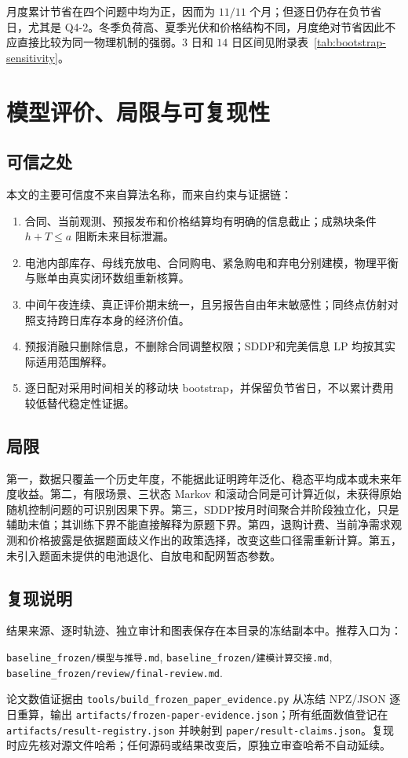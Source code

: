\documentclass[UTF8,a4paper,zihao=-4,fontset=mac]{ctexart}
\begin{document}
月度累计节省在四个问题中均为正，因而为 $11/11$ 个月；但逐日仍存在负节省日，尤其是 Q4-2。冬季负荷高、夏季光伏和价格结构不同，月度绝对节省因此不应直接比较为同一物理机制的强弱。\(3\) 日和 \(14\) 日区间见附录表~\ref{tab:bootstrap-sensitivity}。

\section{模型评价、局限与可复现性}
\subsection{可信之处}
本文的主要可信度不来自算法名称，而来自约束与证据链：
\begin{enumerate}
  \item 合同、当前观测、预报发布和价格结算均有明确的信息截止；成熟块条件 $h+T\le a$ 阻断未来目标泄漏。
  \item 电池内部库存、母线充放电、合同购电、紧急购电和弃电分别建模，物理平衡与账单由真实闭环数组重新核算。
  \item 中间午夜连续、真正评价期末统一，且另报告自由年末敏感性；同终点仿射对照支持跨日库存本身的经济价值。
  \item 预报消融只删除信息，不删除合同调整权限；SDDP和完美信息 LP 均按其实际适用范围解释。
  \item 逐日配对采用时间相关的移动块 bootstrap，并保留负节省日，不以累计费用较低替代稳定性证据。
\end{enumerate}

\subsection{局限}
第一，数据只覆盖一个历史年度，不能据此证明跨年泛化、稳态平均成本或未来年度收益。第二，有限场景、三状态 Markov 和滚动合同是可计算近似，未获得原始随机控制问题的可识别因果下界。第三，SDDP按月时间聚合并阶段独立化，只是辅助末值；其训练下界不能直接解释为原题下界。第四，退购计费、当前净需求观测和价格披露是依据题面歧义作出的政策选择，改变这些口径需重新计算。第五，未引入题面未提供的电池退化、自放电和配网暂态参数。

\subsection{复现说明}
结果来源、逐时轨迹、独立审计和图表保存在本目录的冻结副本中。推荐入口为：
\begin{center}
\texttt{baseline\_frozen/模型与推导.md},\quad
\texttt{baseline\_frozen/建模计算交接.md},\quad
\texttt{baseline\_frozen/review/final-review.md}.
\end{center}
{\raggedright 论文数值证据由 \texttt{tools/build\_frozen\_paper\_evidence.py} 从冻结 NPZ/JSON 逐日重算，输出 \texttt{artifacts/frozen-paper-evidence.json}；所有纸面数值登记在 \texttt{artifacts/result-registry.json} 并映射到 \texttt{paper/result-claims.json}。复现时应先核对源文件哈希；任何源码或结果改变后，原独立审查哈希不自动延续。\par}
\end{document}
